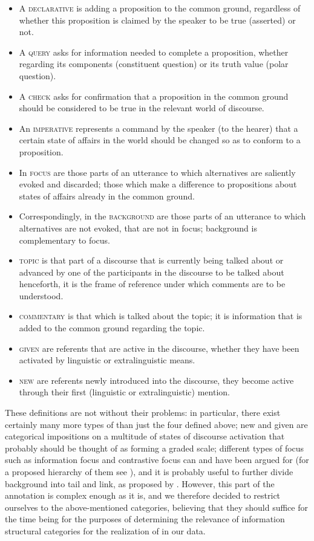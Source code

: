 \documentclass[output=paper]{LSP/langsci}
\begin{document}
\begin{itemize}
\item A \textsc{declarative} is adding a proposition to the common ground, regardless of whether this proposition is claimed by the speaker to be true (asserted) or not.
\item A \textsc{query} asks for information needed to complete a proposition, whether regarding its components (constituent question) or its truth value (polar question).
\item A \textsc{check} asks for confirmation that a proposition in the common ground should be considered to be true in the relevant world of discourse.
\item An \textsc{imperative} represents a command by the speaker (to the hearer) that a certain state of affairs in the world should be changed so as to conform to a proposition.
\item In \textsc{focus} are those parts of an utterance to which alternatives are saliently evoked and discarded; those which make a difference to propositions about states of affairs already in the common ground.
\item Correspondingly, in the \textsc{background} are those parts of an utterance to which alternatives are not evoked, that are not in focus; background is complementary to focus. 
\item \textsc{topic} is that part of a discourse that is currently being talked about or advanced by one of the participants in the discourse to be talked about henceforth, it is the frame of reference under which comments are to be understood. 
\item \textsc{commentary} is that which is talked about the topic; it is information that is added to the common ground regarding the topic. 
\item \textsc{given} are referents that are active in the discourse, whether they have been activated by linguistic or extralinguistic means. 
\item \textsc{new} are referents newly introduced into the discourse, they become active through their first (linguistic or extralinguistic) mention. 
\end{itemize}

These definitions are not without their problems: in particular, there exist certainly many more types of  than just the four defined above; new and given are categorical impositions on a multitude of states of discourse activation that probably should be thought of as forming a graded scale; different types of focus such as information focus and contrastive focus can and have been argued for (for a proposed hierarchy of them see \citealt{Fery2013}), and it is probably useful to further divide background into tail and link, as proposed by \citet{Vallduvi1992}. However, this part of the annotation is complex enough as it is, and we therefore decided to restrict ourselves to the above-mentioned categories, believing that they should suffice for the time being for the purposes of determining the relevance of information structural categories for the realization of  in our data. 
\end{document}
